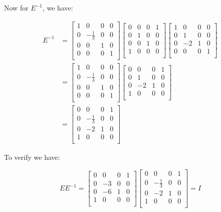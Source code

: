 \documentclass[11pt]{article}
\providecommand{\qbm}[1]{\begin{bmatrix} #1 \end{bmatrix}}
\begin{document}
Now for $E^{-1}$, we have:

\begin{align*}
    E^{-1} &= \qbm{1 & 0 & 0 & 0 \\
        0 & -\frac{1}{3} & 0 & 0 \\
        0 & 0 & 1 & 0 \\
        0 & 0 & 0 & 1 \\}
        \qbm{0 & 0 & 0 & 1 \\
        0 & 1 & 0 & 0 \\
        0 & 0 & 1 & 0 \\
        1 & 0 & 0 & 0 \\}
        \qbm{1 & 0 & 0 & 0 \\
        0 & 1 & 0 & 0 \\
        0 & -2 & 1 & 0 \\
        0 & 0 & 0 & 1 \\} \\
        &= \qbm{1 & 0 & 0 & 0 \\
            0 & -\frac{1}{3} & 0 & 0 \\
            0 & 0 & 1 & 0 \\
            0 & 0 & 0 & 1 \\}
            \qbm{0 & 0 & 0 & 1 \\
        0 & 1 & 0 & 0 \\
        0 & -2 & 1 & 0 \\
        1 & 0 & 0 & 0 \\} \\
        &= \qbm{0 & 0 & 0 & 1 \\
        0 & -\frac{1}{3} & 0 & 0 \\
        0 & -2 & 1 & 0 \\
        1 & 0 & 0 & 0 \\}
\end{align*}

To verify we have:

\begin{equation*}
    E E^{-1} = \qbm{0 & 0 & 0 & 1 \\
        0 & -3 & 0 & 0 \\
        0 & -6 & 1 & 0 \\
        1 & 0 & 0 & 0 \\}
        \qbm{0 & 0 & 0 & 1 \\
    0 & -\frac{1}{3} & 0 & 0 \\
    0 & -2 & 1 & 0 \\
    1 & 0 & 0 & 0 \\} = I
\end{equation*}
\end{document}
